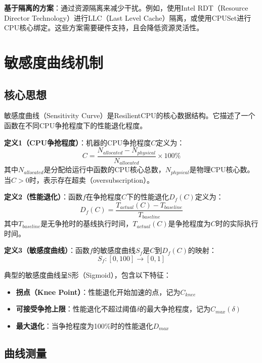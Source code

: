 \documentclass[11pt, a4paper, oneside]{article}
\begin{document}
\textbf{基于隔离的方案}：通过资源隔离来减少干扰。例如，使用Intel RDT（Resource Director Technology）进行LLC（Last Level Cache）隔离，或使用CPUSet进行CPU核心绑定。这些方案需要硬件支持，且会降低资源灵活性。

\section{敏感度曲线机制}

\subsection{核心思想}

敏感度曲线（Sensitivity Curve）是ResilientCPU的核心数据结构。它描述了一个函数在不同CPU争抢程度下的性能退化程度。

\textbf{定义1（CPU争抢程度）}：机器的CPU争抢程度$C$定义为：
\begin{equation}
C = \frac{N_{allocated} - N_{physical}}{N_{allocated}} \times 100\%
\end{equation}
其中$N_{allocated}$是分配给运行中函数的CPU核心总数，$N_{physical}$是物理CPU核心数。当$C > 0$时，表示存在超卖（oversubscription）。

\textbf{定义2（性能退化）}：函数$f$在争抢程度$C$下的性能退化$D_f(C)$定义为：
\begin{equation}
D_f(C) = \frac{T_{actual}(C) - T_{baseline}}{T_{baseline}}
\end{equation}
其中$T_{baseline}$是无争抢时的基线执行时间，$T_{actual}(C)$是争抢程度为$C$时的实际执行时间。

\textbf{定义3（敏感度曲线）}：函数$f$的敏感度曲线$S_f$是$C$到$D_f(C)$的映射：
\begin{equation}
S_f: [0, 100] \rightarrow [0, 1]
\end{equation}

典型的敏感度曲线呈S形（Sigmoid），包含以下特征：
\begin{itemize}
    \item \textbf{拐点（Knee Point）}：性能退化开始加速的点，记为$C_{knee}$
    \item \textbf{可接受争抢上限}：性能退化不超过阈值$\delta$的最大争抢程度，记为$C_{max}(\delta)$
    \item \textbf{最大退化}：当争抢程度为100\%时的性能退化$D_{max}$
\end{itemize}

\subsection{曲线测量}
\end{document}
